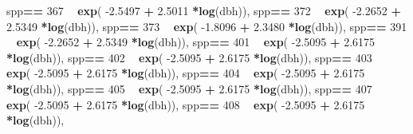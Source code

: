 \documentclass[
]{article}
\newenvironment{Shaded}{\begin{snugshade}}{\end{snugshade}}
\newcommand{\DecValTok}[1]{\textcolor[rgb]{0.00,0.00,0.81}{#1}}
\newcommand{\FloatTok}[1]{\textcolor[rgb]{0.00,0.00,0.81}{#1}}
\newcommand{\KeywordTok}[1]{\textcolor[rgb]{0.13,0.29,0.53}{\textbf{#1}}}
\newcommand{\NormalTok}[1]{#1}
\newcommand{\OperatorTok}[1]{\textcolor[rgb]{0.81,0.36,0.00}{\textbf{#1}}}
\newcommand{\StringTok}[1]{\textcolor[rgb]{0.31,0.60,0.02}{#1}}
\begin{document}
\begin{Shaded}
\begin{Highlighting}[]
\NormalTok{    spp}\OperatorTok{==}\StringTok{ }\DecValTok{367} \OperatorTok{~}\StringTok{ }\KeywordTok{exp}\NormalTok{( }\FloatTok{-2.5497}   \OperatorTok{+}\StringTok{    }\FloatTok{2.5011} \OperatorTok{*}\KeywordTok{log}\NormalTok{(dbh)),}
\NormalTok{    spp}\OperatorTok{==}\StringTok{ }\DecValTok{372} \OperatorTok{~}\StringTok{ }\KeywordTok{exp}\NormalTok{( }\FloatTok{-2.2652}   \OperatorTok{+}\StringTok{    }\FloatTok{2.5349} \OperatorTok{*}\KeywordTok{log}\NormalTok{(dbh)),}
\NormalTok{    spp}\OperatorTok{==}\StringTok{ }\DecValTok{373} \OperatorTok{~}\StringTok{ }\KeywordTok{exp}\NormalTok{( }\FloatTok{-1.8096}   \OperatorTok{+}\StringTok{    }\FloatTok{2.3480} \OperatorTok{*}\KeywordTok{log}\NormalTok{(dbh)), }
\NormalTok{    spp}\OperatorTok{==}\StringTok{ }\DecValTok{391} \OperatorTok{~}\StringTok{ }\KeywordTok{exp}\NormalTok{( }\FloatTok{-2.2652}   \OperatorTok{+}\StringTok{    }\FloatTok{2.5349} \OperatorTok{*}\KeywordTok{log}\NormalTok{(dbh)),}
\NormalTok{    spp}\OperatorTok{==}\StringTok{ }\DecValTok{401} \OperatorTok{~}\StringTok{ }\KeywordTok{exp}\NormalTok{( }\FloatTok{-2.5095}   \OperatorTok{+}\StringTok{    }\FloatTok{2.6175} \OperatorTok{*}\KeywordTok{log}\NormalTok{(dbh)),}
\NormalTok{    spp}\OperatorTok{==}\StringTok{ }\DecValTok{402} \OperatorTok{~}\StringTok{ }\KeywordTok{exp}\NormalTok{( }\FloatTok{-2.5095}   \OperatorTok{+}\StringTok{    }\FloatTok{2.6175} \OperatorTok{*}\KeywordTok{log}\NormalTok{(dbh)),}
\NormalTok{    spp}\OperatorTok{==}\StringTok{ }\DecValTok{403} \OperatorTok{~}\StringTok{ }\KeywordTok{exp}\NormalTok{( }\FloatTok{-2.5095}   \OperatorTok{+}\StringTok{    }\FloatTok{2.6175} \OperatorTok{*}\KeywordTok{log}\NormalTok{(dbh)),}
\NormalTok{    spp}\OperatorTok{==}\StringTok{ }\DecValTok{404} \OperatorTok{~}\StringTok{ }\KeywordTok{exp}\NormalTok{( }\FloatTok{-2.5095}   \OperatorTok{+}\StringTok{    }\FloatTok{2.6175} \OperatorTok{*}\KeywordTok{log}\NormalTok{(dbh)),}
\NormalTok{    spp}\OperatorTok{==}\StringTok{ }\DecValTok{405} \OperatorTok{~}\StringTok{ }\KeywordTok{exp}\NormalTok{( }\FloatTok{-2.5095}   \OperatorTok{+}\StringTok{    }\FloatTok{2.6175} \OperatorTok{*}\KeywordTok{log}\NormalTok{(dbh)),}
\NormalTok{    spp}\OperatorTok{==}\StringTok{ }\DecValTok{407} \OperatorTok{~}\StringTok{ }\KeywordTok{exp}\NormalTok{( }\FloatTok{-2.5095}   \OperatorTok{+}\StringTok{    }\FloatTok{2.6175} \OperatorTok{*}\KeywordTok{log}\NormalTok{(dbh)),}
\NormalTok{    spp}\OperatorTok{==}\StringTok{ }\DecValTok{408} \OperatorTok{~}\StringTok{ }\KeywordTok{exp}\NormalTok{( }\FloatTok{-2.5095}   \OperatorTok{+}\StringTok{    }\FloatTok{2.6175} \OperatorTok{*}\KeywordTok{log}\NormalTok{(dbh)),}

\end{Highlighting}
\end{Shaded}
\end{document}
